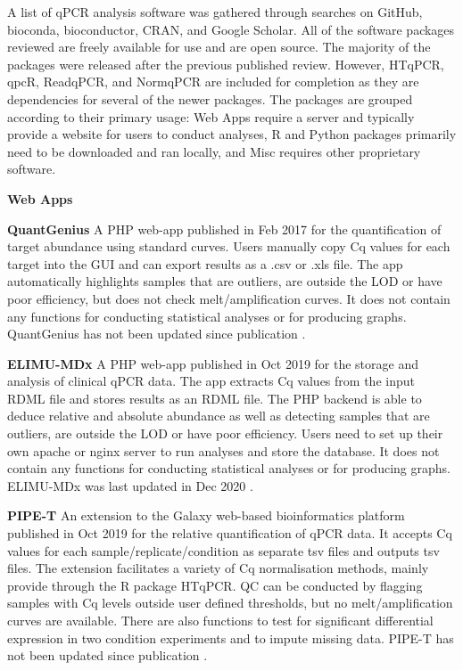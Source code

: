 \documentclass{SBCbookchapter}
\begin{document}
A list of qPCR analysis software was gathered through searches on GitHub, bioconda, bioconductor, CRAN, and Google Scholar.
All of the software packages reviewed are freely available for use and are open source.
The majority of the packages were released after the previous published review.
However, HTqPCR, qpcR, ReadqPCR, and NormqPCR are included for completion as they are dependencies for several of the newer packages.
The packages are grouped according to their primary usage: Web Apps require a server and typically provide a website for users to conduct analyses,  R and Python packages primarily need to be downloaded and ran locally, and Misc requires other proprietary software. 

\textbf{Web Apps}

\textbf{QuantGenius} A PHP web-app published in Feb 2017 for the quantification of target abundance using standard curves. Users manually copy Cq values for each target into the GUI and can export results as a .csv or .xls file. The app automatically highlights samples that are outliers, are outside the LOD or have poor efficiency, but does not check melt/amplification curves. It does not contain any functions for conducting statistical analyses or for producing graphs. QuantGenius has not been updated since publication \cite{Baebler2017}.

\textbf{ELIMU-MDx} A PHP web-app published in Oct 2019 for the storage and analysis of clinical qPCR data. The app extracts Cq values from the input RDML file and stores results as an RDML file. The PHP backend is able to deduce relative and absolute abundance as well as detecting samples that are outliers, are outside the LOD or have poor efficiency. Users need to set up their own apache or nginx server to run analyses and store the database. It does not contain any functions for conducting statistical analyses or for producing graphs. ELIMU-MDx was last updated in Dec 2020 \cite{Krahenbuhl2019}.

\textbf{PIPE-T} An extension to the Galaxy web-based bioinformatics platform published in Oct 2019 for the relative quantification of qPCR data. It accepts Cq values for each sample/replicate/condition as separate tsv files and outputs tsv files. The extension facilitates a variety of Cq normalisation methods, mainly provide through the R package HTqPCR. QC can be conducted by flagging samples with Cq levels outside user defined thresholds, but no melt/amplification curves are available. There are also functions to test for significant differential expression in two condition experiments and to impute missing data. PIPE-T has not been updated since publication \cite{Zanardi2019}.
\end{document}
